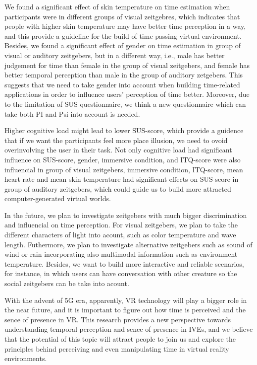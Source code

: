 \documentclass[sigconf]{acmart}
\begin{document}
We found a significant effect of skin temperature on time estimation when participants were in different groups of visual zeitgebres, which indicates that people with higher skin temperature may have better time perception in a way, and this provide a guideline for the build of time-passing virtual environment. Besides, we found a significant effect of gender on time estimation in group of visual or auditory zeitgebers, but in a different way, i.e., male has better judgement for time than female in the group of visual zeitgebers, and female has better temporal perception than male in the group of auditory zetgebers. This suggests that we need to take gender into account when building time-related applications in order to influence users' perception of time better. Moreover, due to the limitation of SUS questionnaire, we think a new questionnaire which can take both PI and Psi into account is needed.

Higher cognitive load might lead to lower SUS-score, which provide a guidence that if we want the participants feel more place illusion, we need to ovoid overinvolving the user in their task. Not only cognitive load had significant influence on SUS-score, gender, immersive condition, and ITQ-score were also influencial in group of visual zeitgebers, immersive condition, ITQ-score, mean heart rate and mean skin temperature had significant effects on SUS-score in group of auditory zeitgebers, which could guide us to build more attracted computer-generated virtual worlds.

In the future, we plan to investigate zeitgebers with much bigger discrimination and influencial on time perception. For visual zeitgebers, we plan to take the different characters of light into acount, such as color temperature and wave length. Futhermore, we plan to investigate alternative zeitgebers such as sound of wind or rain incorporating also multimodal information such as environment temperature. Besides, we want to build more interactive and reliable scenarios, for instance, in which users can have conversation with other creature so the social zeitgebers can be take into acount.

With the advent of 5G era, apparently, VR technology will play a bigger role in the near future, and it is important to figure out how time is perceived and the sence of presence in VR. This research provides a new perspective towards understanding temporal perception and sence of presence in IVEs, and we believe that the potential of this topic will attract people to join us and explore the principles behind perceiving and even manipulating time in virtual reality environments.
\end{document}
